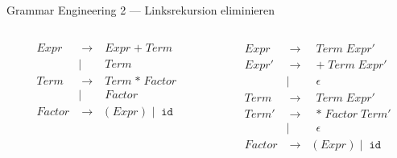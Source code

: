 \documentclass{beamer}
\begin{document}
\begin{frame}{Grammar Engineering 2 --- Linksrekursion eliminieren}
  \begin{columns}
    \begin{column}{0.5\textwidth}
      \begin{alignat*}{2}
        & Expr   & \; \to \; & Expr \; \texttt{+} \; Term \\
              && \mid \;\; & Term \\
        & Term   & \; \to \; & Term \; \texttt{*} \; Factor \\
                && \mid \;\; & Factor \\
        & Factor & \; \to \; & \texttt{(} \; Expr \; \texttt{)} \; \mid \; \texttt{id}
      \end{alignat*}

    \end{column}
    \begin{column}{0.5\textwidth}
      \begin{alignat*}{2}
        & Expr   & \; \to \; & \; Term \; Expr' \\
        & Expr'  & \; \to \; & \; \texttt{+} \; Term \; Expr' \\
                && \mid \;\; & \; \epsilon \\
        & Term   & \; \to \; & \; Term \; Expr' \\
        & Term'  & \; \to \; & \; \texttt{*} \; Factor \; Term' \\
                && \mid \;\; & \; \epsilon \\
        & Factor & \; \to \; & \texttt{(} \; Expr \; \texttt{)} \; \mid \; \texttt{id}
      \end{alignat*}
    \end{column}
  \end{columns}

  \vfill


\end{frame}
\end{document}
